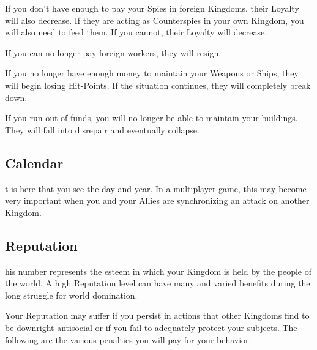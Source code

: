 
If you don’t have enough to pay your Spies in foreign Kingdoms, their Loyalty will also decrease. If they are acting as Counterspies in your own Kingdom, you will also need to feed them. If you cannot, their Loyalty will decrease.

If you can no longer pay foreign workers, they will resign.

If you no longer have enough money to maintain your Weapons or Ships, they will begin losing Hit-Points. If the situation continues, they will completely break down.

If you run out of funds, you will no longer be able to maintain your buildings. They will fall into disrepair and eventually collapse.

\subsection{\textsf{Calendar}}


t is here that you see the day and year. In a multiplayer game, this may become very important when you and your Allies are synchronizing an attack on another Kingdom.

\subsection{\textsf{Reputation}}


his number represents the esteem in which your Kingdom is held by the people of the world. A high Reputation level can have many and varied benefits during the long struggle for world domination.

Your Reputation may suffer if you persist in actions that other Kingdoms find to be downright antisocial or if you fail to adequately protect your subjects. The following are the various penalties you will pay for your behavior:


